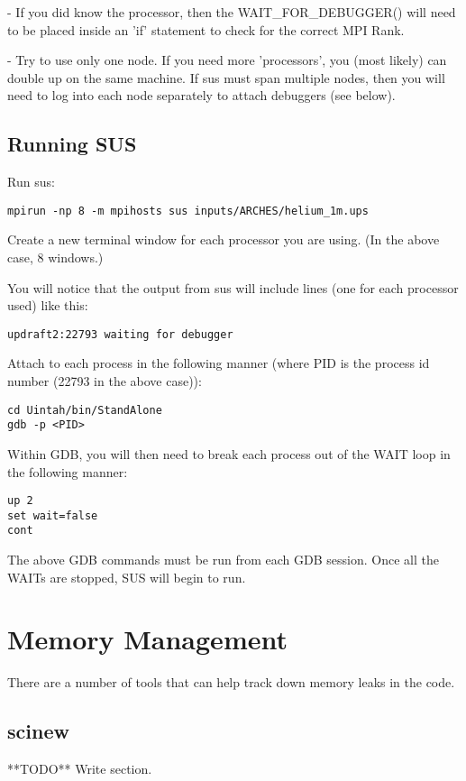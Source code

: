 - If you did know the processor, then the WAIT\_FOR\_DEBUGGER() will
need to be placed inside an 'if' statement to check for the correct
MPI Rank.

- Try to use only one node.  If you need more 'processors', you (most
likely) can double up on the same machine.  If sus must span multiple
nodes, then you will need to log into each node separately to attach
debuggers (see below).

\subsection{Running SUS}

Run sus:

\begin{lstlisting}
mpirun -np 8 -m mpihosts sus inputs/ARCHES/helium_1m.ups
\end{lstlisting}

Create a new terminal window for each processor you are using.  (In
the above case, 8 windows.)  

You will notice that the output from sus will include lines (one for
each processor used) like this:

\begin{lstlisting}
updraft2:22793 waiting for debugger
\end{lstlisting}

Attach to each process in the following manner (where PID is the
process id number (22793 in the above case)):

\begin{lstlisting}
cd Uintah/bin/StandAlone
gdb -p <PID>
\end{lstlisting}

Within GDB, you will then need to break each process out of the WAIT loop in the
following manner:

\begin{lstlisting}
up 2
set wait=false
cont
\end{lstlisting}

The above GDB commands must be run from each GDB session.  Once all
the WAITs are stopped, SUS will begin to run.

\section{Memory Management}

There are a number of tools that can help track down memory leaks in
the code.

\subsection{scinew}
**TODO** Write section.



